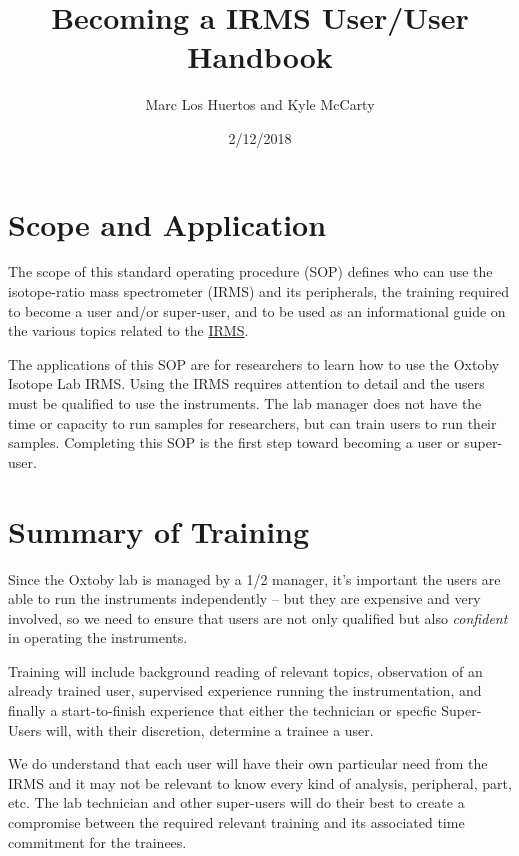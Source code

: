 \documentclass[12pt]{../SOP3_beta}\usepackage[]{graphicx}\usepackage[]{color}
\title{Becoming a IRMS User/User Handbook}
\date{2/12/2018}
\author{Marc Los Huertos and Kyle McCarty}
\begin{document}
\maketitle

\section{Scope and Application}

\NP The scope of this standard operating procedure (SOP) defines who can use the isotope-ratio mass spectrometer (IRMS) and its peripherals, the training required to become a user and/or super-user, and to be used as an informational guide on the various topics related to the \hyperref[IRMS]{IRMS}.

\NP The applications of this SOP are for researchers to learn how to use the Oxtoby Isotope Lab IRMS. Using the IRMS requires attention to detail and the users must be qualified to use the instruments. The lab manager does not have the time or capacity to run samples for researchers, but can train users to run their samples. Completing this SOP is the first step toward becoming a user or super-user.

\section{Summary of Training}

\NP Since the Oxtoby lab is managed by a 1/2 manager, it's important the users are able to run the instruments independently -- but they are expensive and very involved, so we need to ensure that users are not only qualified but also \emph{confident} in operating the instruments.

\NP Training will include background reading of relevant topics, observation of an already trained user, supervised experience running the instrumentation, and finally a start-to-finish experience that either the technician or specfic Super-Users will, with their discretion, determine a trainee a user.

\NP We do understand that each user will have their own particular need from the IRMS and it may not be relevant to know every kind of analysis, peripheral, part, etc. The lab technician and other super-users will do their best to create a compromise between the required relevant training and its associated time commitment for the trainees.

\newpage

\tableofcontents
\end{document}

